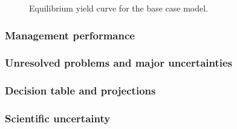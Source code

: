 \documentclass[
]{scrartcl}
\begin{document}
\clearpage



\begin{figure}


\caption{\label{fig-es-yield}Equilibrium yield curve for the base case
model.}

\end{figure}%

\clearpage

\subsubsection{Management performance}\label{management-performance}

\subsubsection{Unresolved problems and major
uncertainties}\label{unresolved-problems-and-major-uncertainties}

\subsubsection{Decision table and
projections}\label{decision-table-and-projections}

\clearpage

\clearpage

\subsubsection{Scientific uncertainty}\label{scientific-uncertainty}
\end{document}
